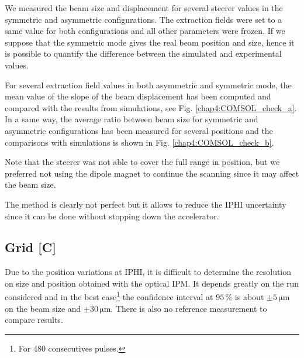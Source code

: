 \begin{refsection}
  We measured the beam size and displacement for several steerer values in the symmetric and asymmetric configurations.
  The extraction fields were set to a same value for both configurations and all other parameters were frozen. If we suppose that the symmetric mode gives the real beam position and size, hence it is possible to quantify the difference between the simulated and experimental values.

  For several extraction field values in both asymmetric and symmetric mode, the mean value of the slope of the beam displacement has been computed and compared with the results from simulations, see Fig. \ref{chap4:COMSOL_check_a}. In a same way, the average ratio between beam size for symmetric and asymmetric configurations has been measured for several positions and the comparisons with simulations is shown in Fig. \ref{chap4:COMSOL_check_b}.

  

  Note that the steerer was not able to cover the full range in position, but we preferred not using the dipole magnet to continue the scanning since it may affect the beam size.

  The method is clearly not perfect but it allows to reduce the IPHI uncertainty since it can be done without stopping down the accelerator.

  \subsection{Grid [C]}

  Due to the position variations at IPHI, it is difficult to determine the resolution on size and position obtained with the optical IPM. It depends greatly on the run considered and in the best case\footnote{For 480 consecutives pulses.} the confidence interval at $95\,\mathrm{\%}$ is about $\pm 5\,\mathrm{\mu m}$ on the beam size and  $\pm 30\,\mathrm{\mu m}$. There is also no reference measurement to compare results.


\end{refsection}
